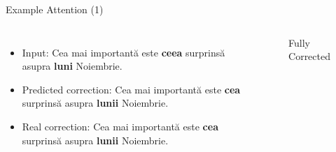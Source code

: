\documentclass[]{beamer}
\begin{document}
        \begin{frame}{Example Attention (1)}
            
            \begin{columns}
                    \begin{itemize}
                        \item Input: Cea mai importantă este \textbf{ceea} surprinsă asupra \textbf{luni} Noiembrie.
                        \item Predicted correction: Cea mai importantă este \textbf{cea} surprinsă asupra \textbf{lunii} Noiembrie.
                        \item Real correction: Cea mai importantă este \textbf{cea} surprinsă asupra \textbf{lunii} Noiembrie.
                    \end{itemize}
                    \begin{figure}[htbp]
                        \centering
                        \caption{Fully Corrected}
                        \label{fig:attention-examples-1}
                    \end{figure}
            \end{columns}
        
        \end{frame}
        
\end{document}
